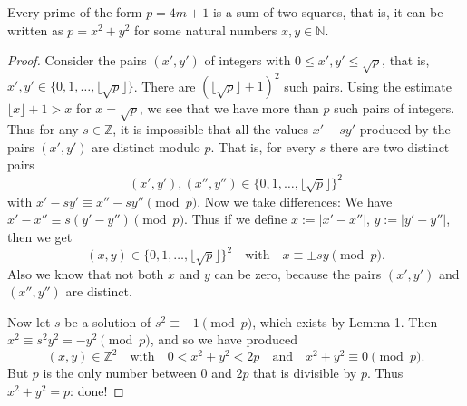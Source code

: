 \begin{proposition}
  \label{ch4.proposition1}
  Every prime of the form \(p = 4m + 1\) is a sum of two squares,
  that is, it can be written as \(p = x^2 + y^2\) for some natural numbers \(x,y \in \mathbb{N}\).
\end{proposition}
\begin{proof}
  Consider the pairs $(x', y')$ of integers with $0 \leq x', y' \leq \sqrt{p}$, that is,
  $x', y' \in \{0, 1, \dots, \lfloor \sqrt{p} \rfloor\}$.
  There are $(\lfloor \sqrt{p} \rfloor + 1)^2$ such pairs.
  Using the estimate $\lfloor x \rfloor + 1 > x$ for $x = \sqrt{p}$, we see that we have more
  than $p$ such pairs of integers. Thus for any $s \in \mathbb{Z}$, it is impossible that all
  the values $x' - sy'$ produced by the pairs $(x', y')$ are distinct modulo $p$. That is, for
  every $s$ there are two distinct pairs
  \[
  (x', y'), (x'', y'') \in \{0, 1, \dots, \lfloor \sqrt{p} \rfloor\}^2
  \]
  with $x' - sy' \equiv x'' - sy'' \pmod{p}$. Now we take differences:
  We have $x' - x'' \equiv s(y' - y'') \pmod{p}$. Thus if we define
  $x := |x' - x''|$, $y := |y' - y''|$, then we get
  \[
  (x, y) \in
  \{0, 1, \dots, \lfloor \sqrt{p} \rfloor\}^2 \quad \text{with} \quad x \equiv \pm sy \pmod{p}.
  \]
  Also we know that not both $x$ and $y$ can be zero, because the pairs $(x', y')$ and $(x'', y'')$
  are distinct.

  Now let $s$ be a solution of $s^2 \equiv -1 \pmod{p}$, which exists by Lemma 1.
  Then $x^2 \equiv s^2 y^2 = -y^2 \pmod{p}$, and so we have produced
  \[
  (x, y) \in
  \mathbb{Z}^2 \quad \text{with} \quad
  0 < x^2 + y^2 < 2p \quad \text{and} \quad x^2 + y^2 \equiv 0 \pmod{p}.
  \]
  But $p$ is the only number between $0$ and $2p$ that is divisible by $p$.
  Thus $x^2 + y^2 = p$: done!
\end{proof}

